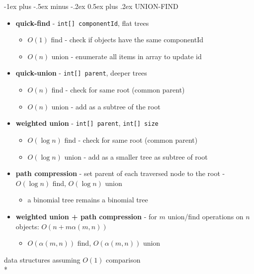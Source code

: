 \documentclass[10pt, landscape]{article}
\makeatletter
\newenvironment{tightcenter}{%
  \setlength\topsep{0pt}
  \setlength\parskip{0pt}
  \begin{center}
}{%
  \end{center}
}
\renewcommand{\section}{\@startsection{section}{1}{0mm}%
                                {-1ex plus -.5ex minus -.2ex}%
                                {0.5ex plus .2ex}%
                                {\normalfont\large\bfseries}}
\newcommand{\code}[1]{\textcolor{myblue}{\texttt{#1}}}
\makeatother
\begin{document}
\begin{multicols}{4}
\section{UNION-FIND}
\begin{itemize}
    \item \textbf{quick-find} - \code{int[] componentId}, flat trees
    \begin{itemize}
        \item $O(1)$ find - check if objects have the same componentId
        \item $O(n)$ union - enumerate all items in array to update id
    \end{itemize}
    \item \textbf{quick-union} - \code{int[] parent}, deeper trees
    \begin{itemize}
        \item $O(n)$ find - check for same root (common parent)
        \item $O(n)$ union - add as a subtree of the root
    \end{itemize}
    \item \textbf{weighted union} - \code{int[] parent}, \code{int[] size}
    \begin{itemize}
        \item $O(\log n)$ find - check for same root (common parent)
        \item $O(\log n)$ union - add as a smaller tree as subtree of root
    \end{itemize}
    \item \textbf{path compression} - set parent of each traversed node to the root - $O(\log n)$ find, $O(\log n)$ union
    \begin{itemize}
        \item a binomial tree remains a binomial tree
    \end{itemize}
    \item \textbf{weighted union + path compression} - for $m$ union/find operations on $n$ objects: $O(n + m\alpha (m, n))$
    \begin{itemize}
        \item $O(\alpha (m, n))$ find, $O(\alpha (m, n))$ union
    \end{itemize}
\end{itemize}
\begin{tightcenter}
    data structures assuming $O(1)$ comparison 
\\* \begin{tabular}{| c | c | c |}\hline

\end{tabular}
\end{tightcenter}
\end{multicols}
\end{document}
